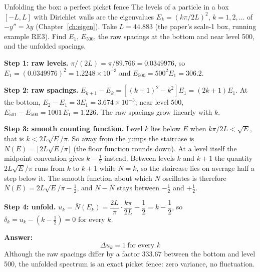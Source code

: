 \begin{sample}{Unfolding the box: a perfect picket fence}
The levels of a particle in a box $[-L,L]$ with Dirichlet walls are the eigenvalues $E_k=(k\pi/2L)^2$, $k=1,2,\dots$ of $-y''=\lambda y$ (Chapter~\ref{ch:eigen}). Take $L=44.883$ (the paper's scale-1 box, running example RE3). Find $E_1$, $E_{500}$, the raw spacings at the bottom and near level 500, and the unfolded spacings.

\textbf{Step 1: raw levels.} $\pi/(2L)=\pi/89.766=0.0349976$, so $E_1=(0.0349976)^2=1.2248\times10^{-3}$ and $E_{500}=500^2E_1=306.2$.

\textbf{Step 2: raw spacings.} $E_{k+1}-E_k=\left[(k+1)^2-k^2\right]E_1=(2k+1)E_1$. At the bottom, $E_2-E_1=3E_1=3.674\times10^{-3}$; near level 500, $E_{501}-E_{500}=1001\,E_1=1.226$. The raw spacings grow linearly with $k$.

\textbf{Step 3: smooth counting function.} Level $k$ lies below $E$ when $k\pi/2L<\sqrt E$, that is $k<2L\sqrt E/\pi$. So away from the jumps the staircase is $N(E)=\lfloor 2L\sqrt{E}/\pi\rfloor$ (the floor function rounds down). At a level itself the midpoint convention gives $k-\tfrac12$ instead. Between levels $k$ and $k+1$ the quantity $2L\sqrt E/\pi$ runs from $k$ to $k+1$ while $N=k$, so the staircase lies on average half a step below it. The smooth function about which $N$ oscillates is therefore $\bar N(E)=2L\sqrt E/\pi-\tfrac12$, and $N-\bar N$ stays between $-\tfrac12$ and $+\tfrac12$.

\textbf{Step 4: unfold.} $u_k=\bar N(E_k)=\dfrac{2L}{\pi}\cdot\dfrac{k\pi}{2L}-\dfrac12=k-\dfrac12$, so $\delta_k=u_k-(k-\tfrac12)=0$ for every $k$.

\textbf{Answer:} \[\boxed{\Delta u_k=1\ \text{for every }k}\] Although the raw spacings differ by a factor $333.67$ between the bottom and level 500, the unfolded spectrum is an exact picket fence: zero variance, no fluctuation.
\end{sample}

